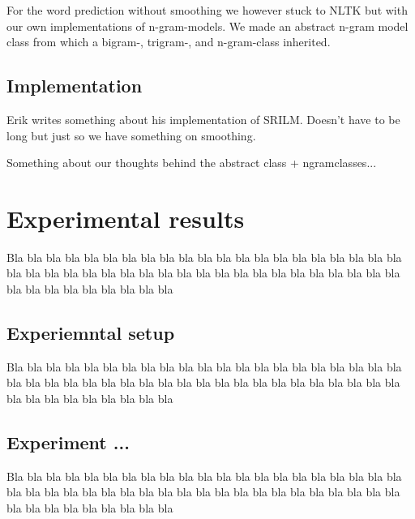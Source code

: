\documentclass[a4paper,12pt]{article}
\begin{document}
For the word prediction without smoothing we however stuck to NLTK but with our own implementations of n-gram-models. We made an abstract n-gram model class from which a bigram-, trigram-, and n-gram-class inherited.

\subsection{Implementation}
\label{sec:impl}

Erik writes something about his implementation of SRILM. Doesn't have to be long but just so we have something on smoothing.

Something about our thoughts behind the abstract class + ngramclasses...

\section{Experimental results}
\label{sec:exps}

Bla bla bla bla bla bla bla bla bla bla bla bla bla bla bla bla bla 
bla bla bla bla bla bla bla bla bla bla bla bla bla bla bla bla bla 
bla bla bla bla bla bla bla bla bla bla bla bla bla bla bla bla bla 

\subsection{Experiemntal setup}
Bla bla bla bla bla bla bla bla bla bla bla bla bla bla bla bla bla 
bla bla bla bla bla bla bla bla bla bla bla bla bla bla bla bla bla 
bla bla bla bla bla bla bla bla bla bla bla bla bla bla bla bla bla 

\subsection{Experiment ...}

Bla bla bla bla bla bla bla bla bla bla bla bla bla bla bla bla bla 
bla bla bla bla bla bla bla bla bla bla bla bla bla bla bla bla bla 
bla bla bla bla bla bla bla bla bla bla bla bla bla bla bla bla bla 
\end{document}

